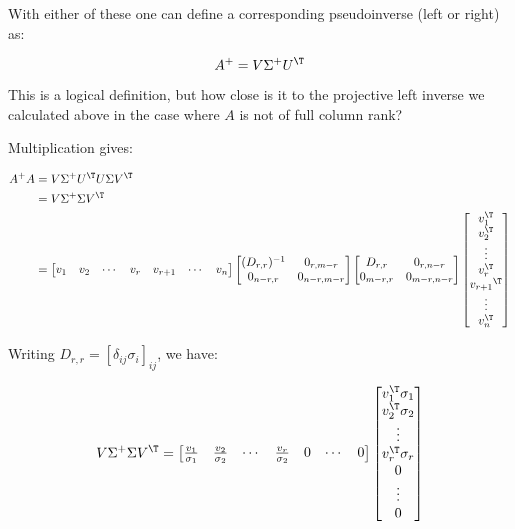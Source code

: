 With either of these one can define a corresponding pseudoinverse (left or right) as:

\begin{equation}
A^{+} = V \Sigma^{+} U^\T
\end{equation}

This is a logical definition, but how close is it to the projective
left inverse we calculated above in the case where $A$ is not of full column 
rank?

Multiplication gives: 

\begin{align*}
A^{+} A 
&= V \Sigma^{+} U^\T U \Sigma V^\T \\
&= V \Sigma^{+} \Sigma V^\T \\
&=
\begin{bmatrix}
v_1 & v_2 & \cdots & v_r & v_{r+1} & \cdots & v_n \\
\end{bmatrix}
\begin{bmatrix}
(D_{r,r})^{-1} & 0_{r,m-r} \\
0_{n-r,r} & 0_{n-r,m-r} \\
\end{bmatrix}
\begin{bmatrix}
D_{r,r} & 0_{r,n-r} \\
0_{m-r,r} & 0_{m-r,n-r} \\
\end{bmatrix}
\begin{bmatrix}
v_1^\T \\ v_2^\T \\ \vdots \\ v_r^\T \\ {v_{r+1}}^\T \\ \vdots \\ v_n^\T \\
\end{bmatrix}
\end{align*}

Writing $D_{r,r} = [\delta_{ij}\sigma_i]_{ij}$, we have:

\begin{equation}\label{eqn:mp_inverse_svd_rough_notes:VIrVt}
V \Sigma^{+} \Sigma V^\T 
=
\begin{bmatrix}
\frac{v_1}{\sigma_1} & \frac{v_2}{\sigma_2} & \cdots & \frac{v_r}{\sigma_2} & 0 & \cdots & 0 
\end{bmatrix}
\begin{bmatrix}
v_1^\T \sigma_1 \\ v_2^\T \sigma_2 \\ \vdots \\ v_r^\T \sigma_r \\ 0 \\ \vdots \\ 0 \\
\end{bmatrix}
\end{equation}

